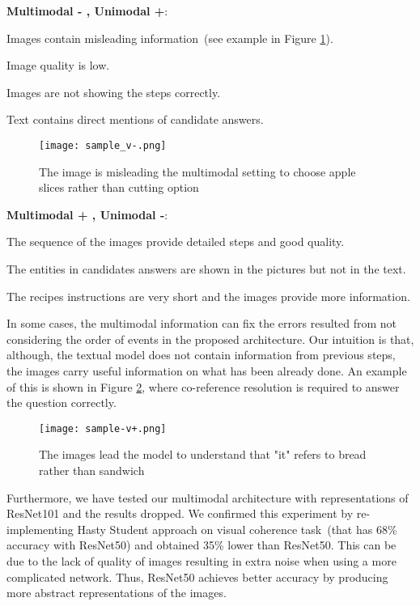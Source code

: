 \documentclass[11pt,a4paper]{article}
\begin{document}
\noindent\textbf{Multimodal - , Unimodal +}:
\begin{compactitem}
    \item Images contain misleading information~(see example in Figure \ref{fig:samplev-}).
    \item Image quality is low.
    \item Images are not showing the steps correctly.
    \item Text contains direct mentions of candidate answers.
\end{compactitem}
\begin{figure}[h]
    \centering
    \texttt{[image: sample\_v-.png]}
    \caption{The image is misleading the multimodal setting to choose apple slices rather than cutting option}
    \label{fig:samplev-}
\end{figure}
\noindent\textbf{Multimodal + , Unimodal -}:
\begin{compactitem}
    \item The sequence of the images provide detailed steps and good quality. 
\item The entities in candidates answers are shown in the pictures but not in the text.
    \item The recipes instructions are very short and the images provide more information.
\end{compactitem}
In some cases, the multimodal information can fix the errors resulted from not considering the order of events in the proposed architecture. Our intuition is that, although, the textual model does not contain information from previous steps, the images carry useful information on what has been already done. An example of this is shown in Figure \ref{fig:samplev+}, where co-reference resolution is required to answer the question correctly.
\begin{figure}[h]
    \centering
    \texttt{[image: sample-v+.png]}
    \caption{The images lead the model to understand that "it" refers to bread rather than sandwich}
    \label{fig:samplev+}
\end{figure}

Furthermore, we have tested our multimodal architecture with representations of ResNet101 and the results dropped. We confirmed this experiment by re-implementing Hasty Student approach on visual coherence task~(that has 68\% accuracy with ResNet50) and obtained 35\% lower than ResNet50. This can be due to the lack of quality of images resulting in extra noise when using a more complicated network. Thus, ResNet50 achieves better accuracy by producing more abstract representations of the images.
\end{document}
